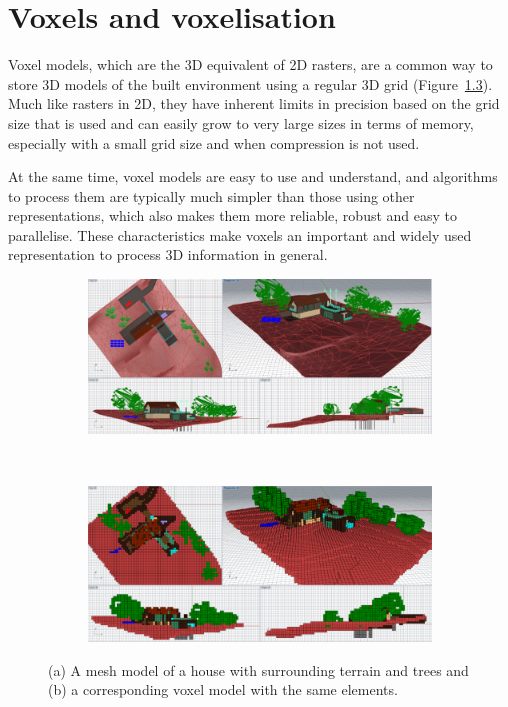 
\setchapterpreamble[u]{\margintoc}

\graphicspath{{voxels/}}
\renewcommand*{\thelesson}{2.1}

\chapter{Voxels and voxelisation}%
\label{chap:voxels}

Voxel models, which are the 3D equivalent of 2D rasters, are a common way to store 3D models of the built environment using a regular 3D grid (Figure~\ref{fig:model}).
Much like rasters in 2D, they have inherent limits in precision based on the grid size that is used and can easily grow to very large sizes in terms of memory, especially with a small grid size and when compression is not used.

At the same time, voxel models are easy to use and understand, and algorithms to process them are typically much simpler than those using other representations, which also makes them more reliable, robust and easy to parallelise.
These characteristics make voxels an important and widely used representation to process 3D information in general.

\begin{figure}[htbp]
\centering
\begin{subfigure}[b]{\linewidth}
\includegraphics[width=\linewidth]{figs/model-pre}
\caption{}%
\label{subfig:model-pre}
\end{subfigure}
\\
\begin{subfigure}[b]{\linewidth}
\includegraphics[width=\linewidth]{figs/model-post}
\caption{}%
\label{subfig:model-post}
\end{subfigure}
\caption{(a) A mesh model of a house with surrounding terrain and trees and (b) a corresponding voxel model with the same elements.}%
\label{fig:model}
\end{figure}

